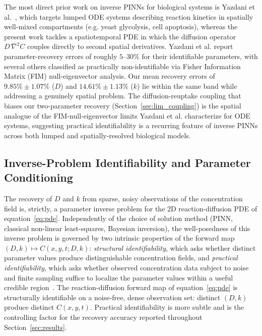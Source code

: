 \documentclass[12pt]{article}
\begin{document}
The most direct prior work on inverse PINNs for biological
systems is Yazdani et al.~\cite{Yazdani2020}, which targets
lumped ODE systems describing reaction kinetics in spatially
well-mixed compartments (e.g. yeast glycolysis, cell apoptosis),
whereas the present work tackles a spatiotemporal PDE in which
the diffusion operator $D\,\nabla^2 C$ couples directly to
second spatial derivatives. Yazdani et al. report
parameter-recovery errors of roughly $5$--$30\%$ for their
identifiable parameters, with several others classified as
practically non-identifiable via Fisher Information Matrix
(FIM) null-eigenvector analysis. Our mean recovery errors of
$9.85\% \pm 1.07\%$ ($D$) and $14.61\% \pm 1.13\%$ ($k$) lie
within the same band while addressing a genuinely spatial
problem. The diffusion-reuptake coupling that biases our
two-parameter recovery (Section~\ref{sec:lim_coupling}) is the
spatial analogue of the FIM-null-eigenvector limits Yazdani et
al. characterize for ODE systems, suggesting practical
identifiability is a recurring feature of inverse PINNs across
both lumped and spatially-resolved biological models.

\subsection{Inverse-Problem Identifiability and Parameter Conditioning}
\label{sec:identifiability}

The recovery of $D$ and $k$ from sparse, noisy observations of
the concentration field is, strictly, a parameter inverse problem
for the 2D reaction-diffusion PDE of equation~\eqref{eq:pde}.
Independently of the choice of solution method (PINN, classical
non-linear least-squares, Bayesian inversion), the well-posedness
of this inverse problem is governed by two intrinsic properties of
the forward map $(D, k) \mapsto C(x, y, t; D, k)$:
\emph{structural identifiability}, which asks whether distinct
parameter values produce distinguishable concentration fields, and
\emph{practical identifiability}, which asks whether observed
concentration data subject to noise and finite sampling suffice to
localize the parameter values within a useful credible
region~\cite{Yazdani2020}. The reaction-diffusion forward map of
equation~\eqref{eq:pde} is structurally identifiable on a
noise-free, dense observation set: distinct $(D, k)$ produce
distinct $C(x, y, t)$. Practical identifiability is more subtle and
is the controlling factor for the recovery accuracy reported
throughout Section~\ref{sec:results}.
\end{document}
